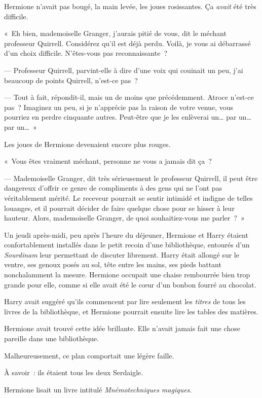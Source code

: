 Hermione n'avait pas bougé, la main levée, les joues rosissantes.
Ça \emph{avait} été très difficile.

«~Eh bien, mademoiselle Granger, j'aurais pitié de vous, dit le méchant professeur Quirrell.
Considérez qu'il est déjà perdu.
Voilà, je vous ai débarrassé d'un choix difficile.
N'êtes-vous pas reconnaissante~?

--- Professeur Quirrell, parvint-elle à dire d'une voix qui couinait un peu, j'ai beaucoup de points Quirrell, n'est-ce pas~?

--- Tout à fait, répondit-il, mais un de moins que précédemment.
Atroce n'est-ce pas~?
Imaginez un peu, si je n'apprécie pas la raison de votre venue, vous pourriez en perdre cinquante autres.
Peut-être que je les enlèverai un… par un… par un…~»

Les joues de Hermione devenaient encore plus rouges.

«~Vous êtes vraiment méchant, personne ne vous a jamais dit ça~?

--- Mademoiselle Granger, dit très sérieusement le professeur Quirrell, il peut être dangereux d'offrir ce genre de compliments à des gens qui ne l'ont pas véritablement mérité.
Le receveur pourrait se sentir intimidé et indigne de telles louanges, et il pourrait décider de faire quelque chose pour se hisser à leur hauteur.
Alors, mademoiselle Granger, de quoi souhaitiez-vous me parler~?~»

\later

Un jeudi après-midi, peu après l'heure du déjeuner, Hermione et Harry étaient confortablement installés dans le petit recoin d'une bibliothèque, entourés d'un \emph{Sourdinam} leur permettant de discuter librement.
Harry était allongé sur le ventre, ses genoux posés au sol, tête entre les mains, ses pieds battant nonchalamment la mesure.
Hermione occupait une chaise rembourrée bien trop grande pour elle, comme si elle avait été le cœur d'un bonbon fourré au chocolat.

Harry avait suggéré qu'ils commencent par lire seulement les \emph{titres} de tous les livres de la bibliothèque, et Hermione pourrait ensuite lire les tables des matières.

Hermione avait trouvé cette idée brillante.
Elle n'avait jamais fait une chose pareille dans une bibliothèque.

Malheureusement, ce plan comportait une légère faille.

À savoir~: ils étaient tous les deux Serdaigle.

Hermione lisait un livre intitulé \emph{Mnémotechniques magiques}.

